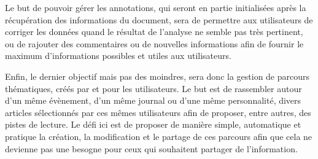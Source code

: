     Le but de pouvoir gérer les annotations, qui seront en partie initialisées après la récupération
    des informations du document, sera de permettre aux utilisateurs de corriger les données quand
    le résultat de l’analyse ne semble pas très pertinent, ou de rajouter des commentaires ou
    de nouvelles informations afin de fournir le maximum d’informations possibles et utiles aux utilisateurs.

    Enfin, le dernier objectif mais pas des moindres, sera donc la gestion de parcours thématiques,
    créés par et pour les utilisateurs. Le but est de rassembler autour d’un même évènement,
    d’un même journal ou d’une même personnalité, divers articles sélectionnés par ces mêmes utilisateurs
    afin de proposer, entre autres, des pistes de lecture. Le défi ici est de proposer de manière simple,
    automatique et pratique la création, la modification et le partage de ces parcours afin que cela
    ne devienne pas une besogne pour ceux qui souhaitent partager de l’information.
